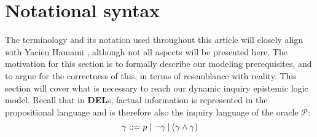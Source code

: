 \section{Notational syntax}
The terminology and its notation used throughout this article will closely
align with Yacien Hamami \cite{delimi}, although not all aspects will be presented here. The motivation for this section is to formally describe our modeling prerequisites, and to argue for the correctness of this, in terms of resemblance with reality. This
section will cover what is necessary to reach our dynamic inquiry epistemic
logic model. Recall that in \textbf{DEL}s, factual information is represented
in the propositional language and is therefore also the inquiry language of the
oracle $\mathscr{P}$: $$ \gamma::= p \:|\:\:\neg\gamma\:|\:(\gamma\land\gamma) $$

